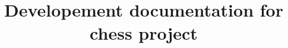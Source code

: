 \documentclass[10pt,a4paper]{article}
\author{}
\date{}
\title{Developement documentation for chess project}
\begin{document}
        \begin{titlepage}
                \maketitle
                \begin{versionhistory}
                \end{versionhistory}
        \end{titlepage}
        \tableofcontents
        \clearpage
	\section{}
			
\end{document}
